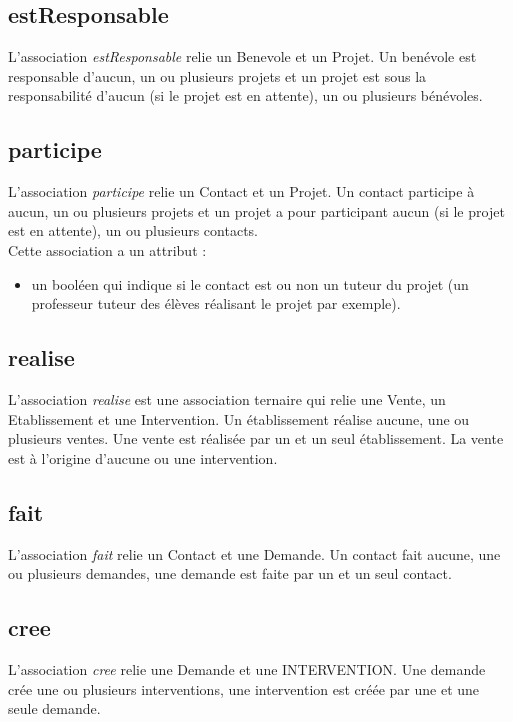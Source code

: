\documentclass[asi, sansVersion]{picInsa}
\begin{document}
\subsection*{estResponsable}
L'association \textit{estResponsable} relie un Benevole et un Projet. Un benévole est responsable d'aucun, un ou plusieurs projets et un projet est sous la responsabilité d'aucun (si le projet est en attente), un ou plusieurs bénévoles.

\subsection*{participe}
L'association \textit{participe} relie un Contact et un Projet. Un contact participe à aucun, un ou plusieurs projets et un projet a pour participant aucun (si le projet est en attente), un ou plusieurs contacts.\\
Cette association a un attribut :
\begin{itemize}
\item un booléen qui indique si le contact est ou non un tuteur du projet (un professeur tuteur des élèves réalisant le projet par exemple). 
\end{itemize}

\subsection*{realise}

L'association \textit{realise} est une association ternaire qui relie une Vente, un Etablissement et une Intervention. Un établissement réalise aucune, une ou plusieurs ventes. Une vente est réalisée par un et un seul établissement. La vente est à l'origine d'aucune ou une intervention.

\subsection*{fait}

L'association \textit{fait} relie un Contact et une Demande. Un contact fait aucune, une ou plusieurs demandes, une demande est faite par un et un seul contact.

\subsection*{cree}

L'association \textit{cree} relie une Demande et une INTERVENTION. Une demande crée une ou plusieurs interventions, une intervention est créée par une et une seule demande.
\end{document}
